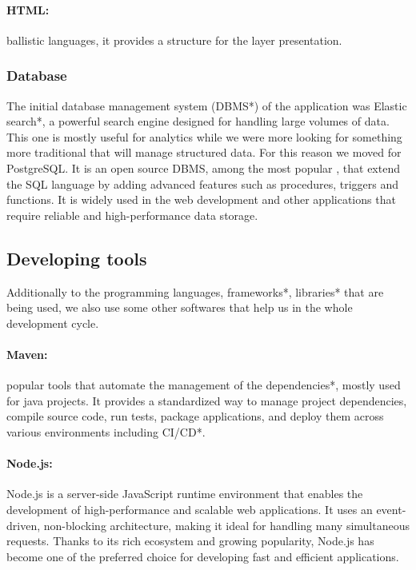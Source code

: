 \documentclass[12pt,a4paper,table,english]{article}
\begin{document}
	\paragraph{HTML:} ballistic languages, it provides a structure for the layer presentation. 

	\subsubsection{Database}
	
	The initial database management system (DBMS*) of the application was Elastic search*, a powerful search engine designed for handling large volumes of data. This one is mostly useful for analytics while we were more looking for something more traditional that will manage structured data. For this reason we moved for PostgreSQL. It is an open source DBMS, among the most popular \citep{stat1, stat2}, that extend the SQL language by adding advanced features such as procedures, triggers and functions. It is widely used in the web development and other applications that require reliable and high-performance data storage.
	
	
	\subsection{Developing tools}
	
	Additionally to the programming languages, frameworks*, libraries* that are being used, we also use some other softwares that help us in the whole development cycle.
	
	\paragraph{Maven:} popular tools that automate the management of the dependencies*, mostly used for java projects. It provides a standardized way to manage project dependencies, compile source code, run tests, package applications, and deploy them across various environments including CI/CD*. 
	
	\paragraph{Node.js:} Node.js is a server-side JavaScript runtime environment that enables the development of high-performance and scalable web applications. It uses an event-driven, non-blocking architecture, making it ideal for handling many simultaneous requests. Thanks to its rich ecosystem and growing popularity, Node.js has become one of the preferred choice for developing fast and efficient applications.
	
\end{document}

